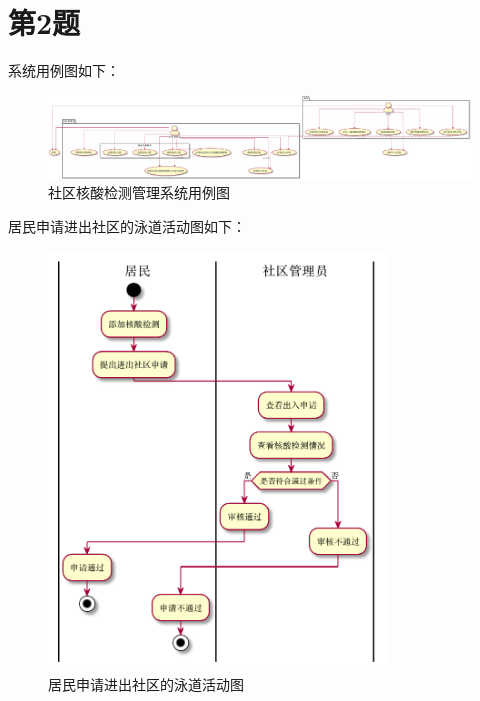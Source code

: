 \documentclass{article}
\begin{document}
    \section*{第2题}
    系统用例图如下：
    \begin{figure}[H]
        \centering
        \includegraphics[width=\textwidth]{./fig/hw04/2.1.pdf}
        \caption{社区核酸检测管理系统用例图}
    \end{figure}
    居民申请进出社区的泳道活动图如下：
    \begin{figure}[H]
        \centering
        \includegraphics[width=0.8\textwidth]{./fig/hw04/2.2.pdf}
        \caption{居民申请进出社区的泳道活动图}
    \end{figure}
\end{document}
